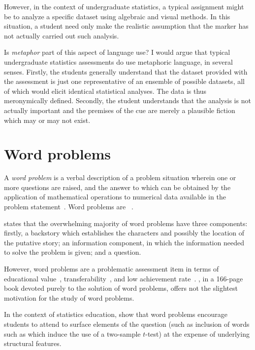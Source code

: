 However, in the context of undergraduate statistics, a typical
assignment might be to analyze a specific dataset using algebraic and
visual methods.  In this situation, a student need only make the
realistic assumption that the marker has not actually carried out such
analysis.

Is \emph{metaphor} part of this aspect of language use?  I would argue
that typical undergraduate statistics assessments do use metaphoric
language, in several senses.  Firstly, the students generally
understand that the dataset provided with the assessment is just one
representative of an ensemble of possible datasets, all of which would
elicit identical statistical analyses.  The data is thus meronymically
defined.  Secondly, the student understands that the analysis is not
actually important and the premises of the cue are merely a plausible
fiction which may or may not exist.

\section{Word problems}

A \emph{word problem} is a verbal description of a problem situation
wherein one or more questions are raised, and the answer to which can
be obtained by the application of mathematical operations to numerical
data available in the problem statement~\citep{verschaffel2014}.  Word
problems are ~\citep{reusser1997}.

 states that the overwhelming majority of word
problems have three components: firstly, a backstory which establishes
the characters and possibly the location of the putative story; an
information component, in which the information needed to solve the
problem is given; and a question.

However, word problems are a problematic assessment item in terms of
educational value~\citep{gerofsky1996},
transferability~\citep{reusser1997}, and low achievement
rate~\citep{cummins1988}.  , in a 166-page book
devoted purely to the solution of word problems, offers not the
slightest motivation for the study of word problems.

In the context of statistics education,  show that
word problems encourage students to attend to surface elements of the
question (such as inclusion of words such as  which
induce the use of a two-sample $t$-test) at the expense of underlying
structural features.

